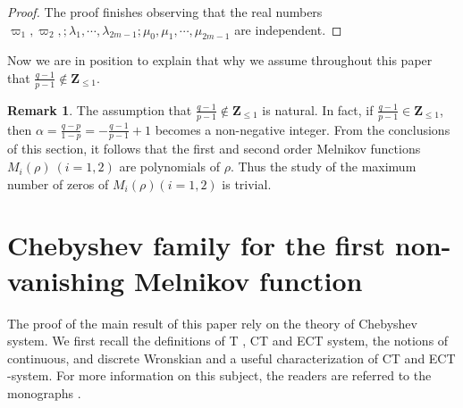 \documentclass[11pt]{amsart}
\theoremstyle{remark}
\theoremstyle{definition}
\newtheorem{rem}[thm]{Remark}
\begin{document}
\begin{proof}
 The proof finishes observing that the real numbers $\varpi_1, \varpi_2,; \lambda_1, \cdots,\lambda_{2m-1}; \mu_0, \mu_1, \cdots,\mu_{2m-1}$
are independent.







\end{proof}





Now we are in position  to explain   that why we assume throughout this paper that $ \frac{q-1}{p-1}\notin \mathbf{Z}_{\leq 1}$.
  \begin{rem} The assumption that  $ \frac{q-1}{p-1}\notin \mathbf{Z}_{\leq1}$  is  natural. In fact, if $ \frac{q-1}{p-1}\in \mathbf{Z}_{\leq 1}$, then  $\alpha=\frac{q-p}{1-p}=-\frac{q-1}{p-1}+1$   becomes  a non-negative integer. From the conclusions of this section, it follows   that the first and  second order Melnikov functions $M_i(\rho) \ (i=1,2)$
are polynomials of $\rho$. Thus the study of the  maximum number of zeros of
$M_i(\rho) (i=1,2)$  is   trivial.
\end{rem}















\section{  Chebyshev family for the first non-vanishing Melnikov function}
The proof of the main result of this paper rely on the theory of  Chebyshev system. We first recall the definitions of T , CT and ECT system, the notions of continuous,
and discrete Wronskian and a useful characterization of CT and ECT -system. For more information on this subject, the readers are referred to the monographs \cite{KS1966}.
\end{document}
